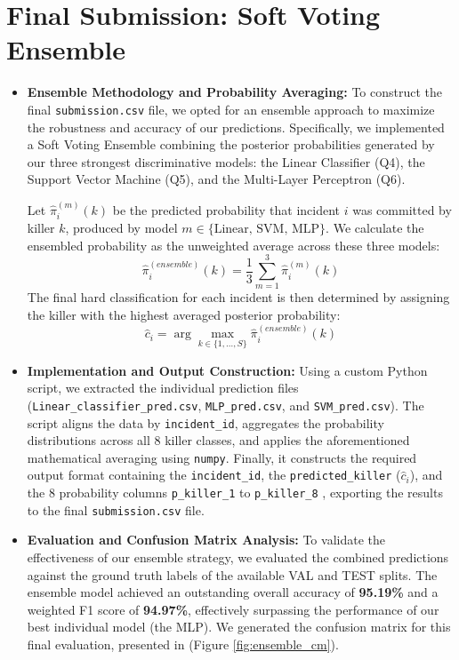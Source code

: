 \documentclass{article}
\begin{document}
\section*{Final Submission: Soft Voting Ensemble}
\begin{itemize}
\item \textbf{Ensemble Methodology and Probability Averaging:}
To construct the final \texttt{submission.csv} file, we opted for an ensemble approach to maximize the robustness and accuracy of our predictions. Specifically, we implemented a Soft Voting Ensemble combining the posterior probabilities generated by our three strongest discriminative models: the Linear Classifier (Q4), the Support Vector Machine (Q5), and the Multi-Layer Perceptron (Q6). 

Let $\hat{\pi}_{i}^{(m)}(k)$ be the predicted probability that incident $i$ was committed by killer $k$, produced by model $m \in \{\text{Linear, SVM, MLP}\}$. We calculate the ensembled probability as the unweighted average across these three models:
\begin{equation}
    \hat{\pi}_{i}^{(ensemble)}(k) = \frac{1}{3} \sum_{m=1}^{3} \hat{\pi}_{i}^{(m)}(k)
\end{equation}
The final hard classification for each incident is then determined by assigning the killer with the highest averaged posterior probability:
\begin{equation}
    \hat{c}_i = \arg\max_{k\in\{1,\dots,S\}} \hat{\pi}_{i}^{(ensemble)}(k)
\end{equation}

\item \textbf{Implementation and Output Construction:}
Using a custom Python script, we extracted the individual prediction files (\texttt{Linear\_classifier\_pred.csv}, \texttt{MLP\_pred.csv}, and \texttt{SVM\_pred.csv}). The script aligns the data by \texttt{incident\_id}, aggregates the probability distributions across all 8 killer classes, and applies the aforementioned mathematical averaging using \texttt{numpy}. Finally, it constructs the required output format containing the \texttt{incident\_id}, the \texttt{predicted\_killer} ($\hat{c}_i$), and the 8 probability columns \texttt{p\_killer\_1} to \texttt{p\_killer\_8} , exporting the results to the final \texttt{submission.csv} file.

\item \textbf{Evaluation and Confusion Matrix Analysis:}
To validate the effectiveness of our ensemble strategy, we evaluated the combined predictions against the ground truth labels of the available VAL and TEST splits. The ensemble model achieved an outstanding overall accuracy of \textbf{95.19\%} and a weighted F1 score of \textbf{94.97\%}, effectively surpassing the performance of our best individual model (the MLP). We generated the confusion matrix for this final evaluation, presented in (Figure \ref{fig:ensemble_cm}).


\end{itemize}
\end{document}

